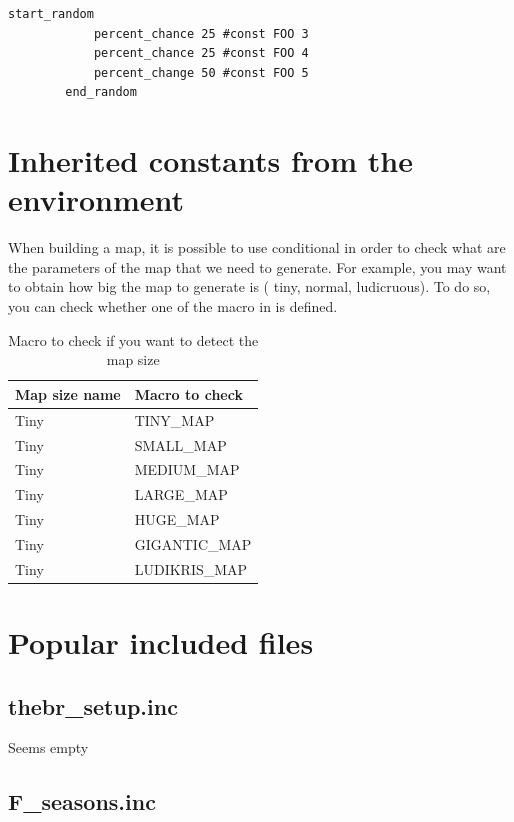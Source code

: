 \begin{appendices}
    \begin{lstlisting}[language=rms,label=rms:startrandom]
        start_random
            percent_chance 25 #const FOO 3
            percent_chance 25 #const FOO 4
            percent_change 50 #const FOO 5
        end_random
    \end{lstlisting}

    \section{Inherited constants from the environment}

    When building a map, it is possible to use conditional in order to check what are the parameters of the map that we need to generate. For example, you may want to obtain how big the map to generate is (\eg{} tiny, normal, ludicruous). To do so, you can check whether one of the macro in  is defined.

    \begin{table}
        \centering
        \begin{tabular}{ll}
            \toprule
            Map size name & Macro to check \\
            \midrule
            Tiny & TINY\_MAP \\
            Tiny & SMALL\_MAP \\
            Tiny & MEDIUM\_MAP \\
            Tiny & LARGE\_MAP \\
            Tiny & HUGE\_MAP \\
            Tiny & GIGANTIC\_MAP \\
            Tiny & LUDIKRIS\_MAP \\
            \bottomrule
        \end{tabular}
        \caption{Macro to check if you want to detect the map size}
        \label{tbl:mapsizemacro}
    \end{table}

    \section{Popular included files}

    \subsection{thebr\_setup.inc}

    Seems empty

    \subsection{F\_seasons.inc}


\end{appendices}
